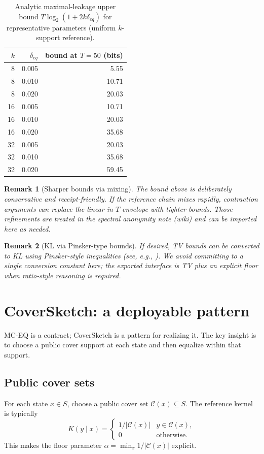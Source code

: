 \documentclass[11pt]{article}
\newtheorem{remark}{Remark}
\begin{document}
\begin{table}[t]
\centering
\small
\begin{tabular}{@{}r r r@{}}
\toprule
$k$ & $\delta_{eq}$ & bound at $T=50$ (bits) \\
\midrule
8 & 0.005 & 5.55 \\
8 & 0.010 & 10.71 \\
8 & 0.020 & 20.03 \\
16 & 0.005 & 10.71 \\
16 & 0.010 & 20.03 \\
16 & 0.020 & 35.68 \\
32 & 0.005 & 20.03 \\
32 & 0.010 & 35.68 \\
32 & 0.020 & 59.45 \\
\bottomrule
\end{tabular}
\caption{Analytic maximal-leakage upper bound $T\log_2(1+2k\delta_{eq})$ for representative parameters (uniform $k$-support reference).}
\label{tab:session-bound}
\end{table}

\begin{remark}[Sharper bounds via mixing]
The bound above is deliberately conservative and receipt-friendly.
If the reference chain mixes rapidly, contraction arguments can replace the linear-in-$T$ envelope with tighter bounds.
Those refinements are treated in the spectral anonymity note (wiki) and can be imported here as needed.
\end{remark}

\begin{remark}[KL via Pinsker-type bounds]
If desired, TV bounds can be converted to KL using Pinsker-style inequalities (see, e.g., \cite{canonne_kl_tv}).
We avoid committing to a single conversion constant here; the exported interface is TV plus an explicit floor when ratio-style reasoning is required.
\end{remark}

\section{CoverSketch: a deployable pattern}
MC-EQ is a contract; CoverSketch is a pattern for realizing it.
The key insight is to choose a public cover support at each state and then equalize within that support.

\subsection{Public cover sets}
For each state $x\in S$, choose a public cover set $\mathcal{C}(x)\subseteq S$.
The reference kernel is typically
\[
K(y\mid x) = \begin{cases}1/|\mathcal{C}(x)| & y\in \mathcal{C}(x),\\ 0 & \text{otherwise.}\end{cases}
\]
This makes the floor parameter $\alpha = \min_x 1/|\mathcal{C}(x)|$ explicit.
\end{document}
